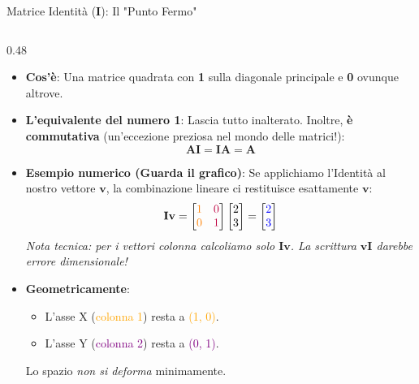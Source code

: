 \documentclass[aspectratio=169, 10pt]{beamer}
\begin{document}
\begin{frame}{Matrice Identità ($\mathbf{I}$): Il "Punto Fermo"}
    \begin{columns}[T,onlytextwidth]
        \setlength{\columnsep}{0.25cm}
        \begin{column}{0.48\textwidth}
            \scriptsize
            \vspace{0.1cm}
            \begin{itemize}
                \setlength\itemsep{0.5em}
                \item \textbf{Cos'è}: Una matrice quadrata con \textbf{1} sulla diagonale principale e \textbf{0} ovunque altrove.
                
                \item \textbf{L'equivalente del numero 1}:
                Lascia tutto inalterato. Inoltre, \textbf{è commutativa} (un'eccezione preziosa nel mondo delle matrici!):
                \[ \mathbf{A}\mathbf{I} = \mathbf{I}\mathbf{A} = \mathbf{A} \]
                
                \item \textbf{Esempio numerico (Guarda il grafico)}:
                Se applichiamo l'Identità al nostro vettore $\mathbf{v}$, la combinazione lineare ci restituisce esattamente $\mathbf{v}$:
                \[
                \mathbf{I}\mathbf{v} = \begin{bmatrix} \color{orange}1 & \color{purple}0 \\ \color{orange}0 & \color{purple}1 \end{bmatrix} \begin{bmatrix} 2 \\ 3 \end{bmatrix} = \begin{bmatrix} \color{blue}2 \\ \color{blue}3 \end{bmatrix}
                \]
                \vspace{-0.1cm}
                \textit{\tiny Nota tecnica: per i vettori colonna calcoliamo solo $\mathbf{I}\mathbf{v}$. La scrittura $\mathbf{v}\mathbf{I}$ darebbe errore dimensionale!}
                
                \item \textbf{Geometricamente}:
                \begin{itemize}
                    \item L'asse X (\textcolor{orange}{colonna 1}) resta a \textcolor{orange}{(1, 0)}.
                    \item L'asse Y (\textcolor{purple}{colonna 2}) resta a \textcolor{purple}{(0, 1)}.
                \end{itemize}
                Lo spazio \emph{non si deforma} minimamente.
            \end{itemize}
        \end{column}
        

\end{columns}
\end{frame}
\end{document}
